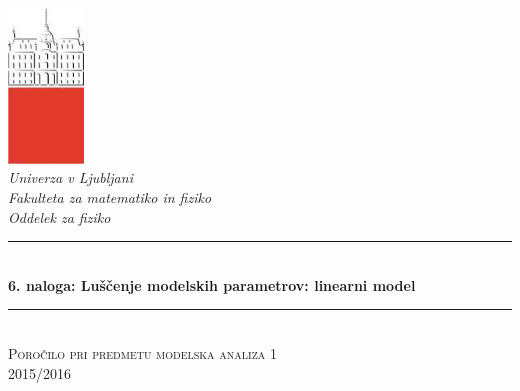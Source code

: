 \documentclass[slovene,11pt,a4paper]{article}
\numberwithin{equation}{section} %
\numberwithin{figure}{section} %
\numberwithin{table}{section} %
\begin{document}
\begin{titlepage}

\newcommand{\HRule}{\rule{\linewidth}{0.5mm}} %

\center %


 

\includegraphics[width=2cm]{slike/aaa}\\[0.5cm]
 
\textit{Univerza v Ljubljani}\\
\textit{Fakulteta za {\color{red}matematiko in fiziko}}\\[0.5cm]

\emph{Oddelek za fiziko}\\[0.5cm] %


\HRule \\[0.4cm]
\huge {\bfseries 6. naloga: Luščenje modelskih parametrov: linearni model}\\[0.4cm] %
\HRule \\[0.5cm] 

 \textsc{\large Poročilo pri predmetu modelska analiza 1}\\
 \textsc{\large 2015/2016}\\[1cm] %
 

\end{titlepage}
\end{document}

